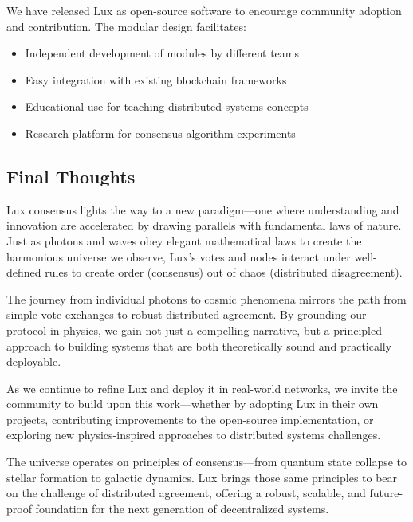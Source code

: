 We have released Lux as open-source software to encourage community adoption and contribution. The modular design facilitates:

\begin{itemize}
\item Independent development of modules by different teams
\item Easy integration with existing blockchain frameworks
\item Educational use for teaching distributed systems concepts
\item Research platform for consensus algorithm experiments
\end{itemize}

\subsection{Final Thoughts}

Lux consensus lights the way to a new paradigm—one where understanding and innovation are accelerated by drawing parallels with fundamental laws of nature. Just as photons and waves obey elegant mathematical laws to create the harmonious universe we observe, Lux's votes and nodes interact under well-defined rules to create order (consensus) out of chaos (distributed disagreement).

The journey from individual photons to cosmic phenomena mirrors the path from simple vote exchanges to robust distributed agreement. By grounding our protocol in physics, we gain not just a compelling narrative, but a principled approach to building systems that are both theoretically sound and practically deployable.

As we continue to refine Lux and deploy it in real-world networks, we invite the community to build upon this work—whether by adopting Lux in their own projects, contributing improvements to the open-source implementation, or exploring new physics-inspired approaches to distributed systems challenges.

The universe operates on principles of consensus—from quantum state collapse to stellar formation to galactic dynamics. Lux brings those same principles to bear on the challenge of distributed agreement, offering a robust, scalable, and future-proof foundation for the next generation of decentralized systems.
